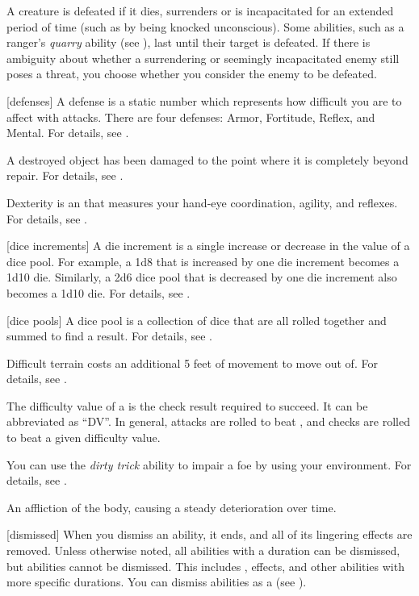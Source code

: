  A creature is defeated if it dies, surrenders or is incapacitated for an extended period of time (such as by being knocked unconscious).
Some abilities, such as a ranger's \textit{quarry} ability (see ), last until their target is defeated.
If there is ambiguity about whether a surrendering or seemingly incapacitated enemy still poses a threat, you choose whether you consider the enemy to be defeated.

[defenses] A defense is a static number which represents how difficult you are to affect with attacks.
There are four defenses: Armor, Fortitude, Reflex, and Mental.
For details, see .

 A destroyed object has been damaged to the point where it is completely beyond repair.
For details, see .

 Dexterity is an  that measures your hand-eye coordination, agility, and reflexes.
For details, see .

[dice increments] A die increment is a single increase or decrease in the value of a dice pool.
For example, a 1d8 that is increased by one die increment becomes a 1d10 die.
Similarly, a 2d6 dice pool that is decreased by one die increment also becomes a 1d10 die.
For details, see .

[dice pools] A dice pool is a collection of dice that are all rolled together and summed to find a result.
For details, see .

 Difficult terrain costs an additional 5 feet of movement to move out of.
For details, see .

 The difficulty value of a  is the check result required to succeed.
It can be abbreviated as ``DV''.
In general, attacks are rolled to beat , and checks are rolled to beat a given difficulty value.

 You can use the \textit{dirty trick} ability to impair a foe by using your environment.
For details, see .

 An affliction of the body, causing a steady deterioration over time.

[dismissed] When you dismiss an ability, it ends, and all of its lingering effects are removed.
Unless otherwise noted, all \magical abilities with a duration can be dismissed, but  abilities cannot be dismissed.
This includes ,  effects, and other abilities with more specific durations.
You can dismiss abilities as a  (see ).

